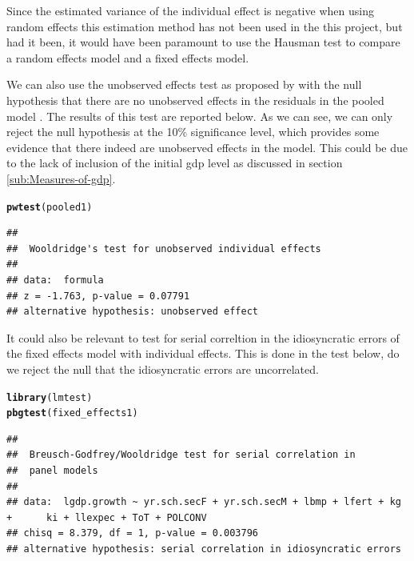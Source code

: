 \documentclass{article}\usepackage{graphicx, color}
\makeatletter
\newcommand{\hlfunctioncall}[1]{\textcolor[rgb]{0.501960784313725,0,0.329411764705882}{\textbf{#1}}}%
\newenvironment{kframe}{%
 \def\at@end@of@kframe{}%
 \ifinner\ifhmode%
  \def\at@end@of@kframe{\end{minipage}}%
  \begin{minipage}{\columnwidth}%
 \fi\fi%
 \def\FrameCommand##1{\hskip\@totalleftmargin \hskip-\fboxsep
 \colorbox{shadecolor}{##1}\hskip-\fboxsep
     \hskip-\linewidth \hskip-\@totalleftmargin \hskip\columnwidth}%
 \MakeFramed {\advance\hsize-\width
   \@totalleftmargin\z@ \linewidth\hsize
   \@setminipage}}%
 {\par\unskip\endMakeFramed%
 \at@end@of@kframe}
\newenvironment{knitrout}{}{} %
\makeatother
\begin{document}
Since the estimated variance of the individual effect is negative
when using random effects this estimation method has not been used
in the this project, but had it been, it would have been paramount
to use the Hausman test \citep{hausman1978specification} to compare
a random effects model and a fixed effects model.

We can also use the unobserved effects test as proposed by \citet{wooldridge2001econometric}
with the null hypothesis that there are no unobserved effects in the
residuals in the pooled model \citep[p. 23]{croissant2008paneldata}.
The results of this test are reported below. As we can see, we can
only reject the null hypothesis at the 10\% significance level, which
provides some evidence that there indeed are unobserved effects in
the model. This could be due to the lack of inclusion of the initial
gdp level as discussed in section \vref{sub:Measures-of-gdp}.

\begin{knitrout}
\color{fgcolor}\begin{kframe}
\begin{alltt}
\hlfunctioncall{pwtest}(pooled1)
\end{alltt}
\begin{verbatim}
## 
## 	Wooldridge's test for unobserved individual effects
## 
## data:  formula 
## z = -1.763, p-value = 0.07791
## alternative hypothesis: unobserved effect
\end{verbatim}
\end{kframe}
\end{knitrout}


It could also be relevant to test for serial correltion in the idiosyncratic
errors of the fixed effects model with individual effects. This is
done in the test below, do we reject the null that the idiosyncratic
errors are uncorrelated.

\begin{knitrout}
\color{fgcolor}\begin{kframe}
\begin{alltt}
\hlfunctioncall{library}(lmtest)
\hlfunctioncall{pbgtest}(fixed_effects1)
\end{alltt}
\begin{verbatim}
## 
## 	Breusch-Godfrey/Wooldridge test for serial correlation in
## 	panel models
## 
## data:  lgdp.growth ~ yr.sch.secF + yr.sch.secM + lbmp + lfert + kg +      ki + llexpec + ToT + POLCONV 
## chisq = 8.379, df = 1, p-value = 0.003796
## alternative hypothesis: serial correlation in idiosyncratic errors
\end{verbatim}
\end{kframe}
\end{knitrout}
\end{document}
